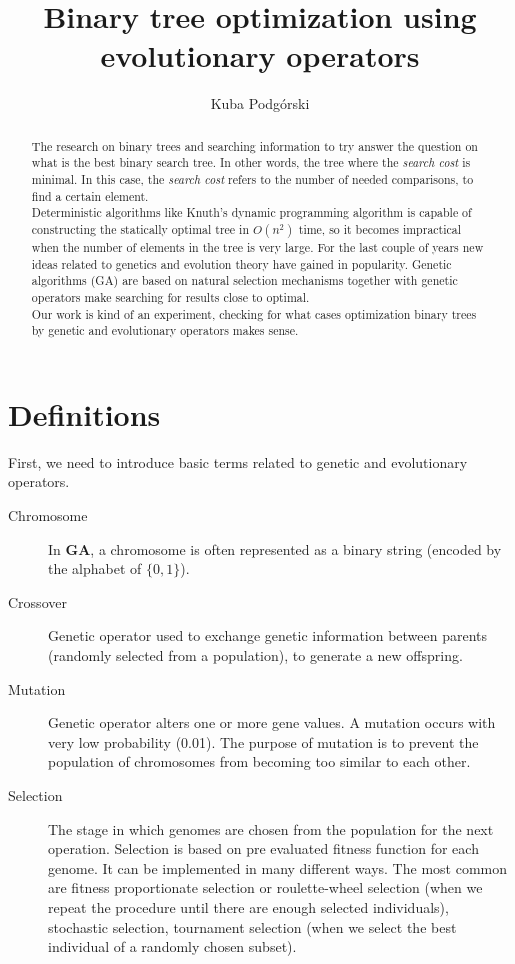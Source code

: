\documentclass[12pt]{article}
\author{Kuba Podgórski}
\title{{\bf Binary tree optimization using evolutionary operators}}
\begin{document}
\maketitle

\begin{abstract}
The research on binary trees and searching information to try answer the question on what is the best binary search tree. In other words, the tree where the \textit{search cost} is minimal.
In this case, the \textit{search cost} refers to the number of needed comparisons, to find a certain element.\\
Deterministic algorithms like Knuth's dynamic programming algorithm is capable of constructing the statically optimal tree in $O(n^2)$ time, so it becomes impractical when the number of elements in the tree is very large. For the last couple of years new ideas related to genetics and evolution theory have gained in popularity. Genetic algorithms (GA) are based on natural selection mechanisms together with genetic operators make searching for results close to optimal.\\
Our work is kind of an experiment, checking for what cases optimization binary trees by genetic and evolutionary operators makes sense.
\end{abstract}

\section{Definitions}
First, we need to introduce basic terms related to genetic and evolutionary operators.
\begin{description}
\item[Chromosome] In \textbf{GA}, a chromosome is often represented as a binary string (encoded by the alphabet of $\{0, 1\}$).
\item[Crossover] Genetic operator used to exchange genetic information between parents (randomly selected from a population), to generate a new offspring.
\item[Mutation] Genetic operator alters one or more gene values. A mutation occurs with very low probability (0.01). The purpose of mutation is to prevent the population of chromosomes from becoming too similar to each other.
\item[Selection] The stage in which genomes are chosen from the population for the next operation. Selection is based on pre evaluated fitness function for each genome. It can be implemented in many different ways. The most common are fitness proportionate selection or roulette-wheel selection (when we repeat the procedure until there are enough selected individuals), stochastic selection, tournament selection (when we select the best individual of a randomly chosen subset).
\end{description}
\end{document}
